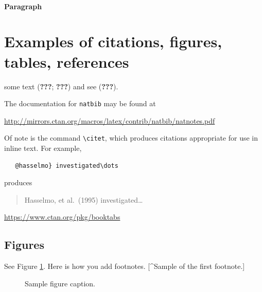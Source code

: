 \documentclass{article}
\begin{document}
\lipsum[6]

\paragraph{Paragraph}
\lipsum[7]

\hypertarget{examples-of-citations-figures-tables-references}{%
\section{Examples of citations, figures, tables,
references}\label{examples-of-citations-figures-tables-references}}

\label{sec:others}

\lipsum[8] some text ({\textbf{???}}; {\textbf{???}}) and see
({\textbf{???}}).

The documentation for \verb+natbib+ may be found at

\begin{center}
  \url{http://mirrors.ctan.org/macros/latex/contrib/natbib/natnotes.pdf}
\end{center}

Of note is the command \verb+\citet+, which produces citations
appropriate for use in inline text. For example,

\begin{verbatim}
   @hasselmo} investigated\dots
\end{verbatim}

produces

\begin{quote}
  Hasselmo, et al.\ (1995) investigated\dots
\end{quote}

\begin{center}
  \url{https://www.ctan.org/pkg/booktabs}
\end{center}

\hypertarget{figures}{%
\subsection{Figures}\label{figures}}

\lipsum[10]

See Figure \ref{fig:fig1}. Here is how you add footnotes. {[}\^{}Sample
of the first footnote.{]}

\lipsum[11]

\begin{figure}
  \centering
  \fbox{\rule[-.5cm]{4cm}{4cm} \rule[-.5cm]{4cm}{0cm}}
  \caption{Sample figure caption.}
  \label{fig:fig1}
\end{figure}
\end{document}
